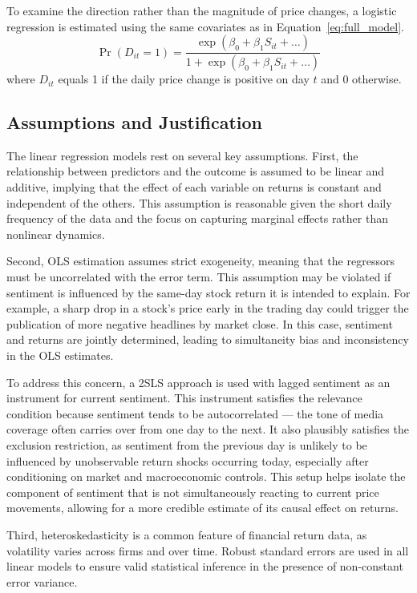 \documentclass[12pt]{article}
\begin{document}
To examine the direction rather than the magnitude of price changes, a logistic regression is estimated using the same covariates as in Equation~\ref{eq:full_model}.
\begin{equation} 
\Pr(D_{it} = 1) = \frac{\exp(\beta_0 + \beta_1 S_{it} + \ldots)}{1 + \exp(\beta_0 + \beta_1 S_{it} + \ldots)} 
\end{equation} 
where $D_{it}$ equals 1 if the daily price change is positive on day $t$ and 0 otherwise.

\subsection{Assumptions and Justification}
The linear regression models rest on several key assumptions. First, the relationship between predictors and the outcome is assumed to be linear and additive, implying that the effect of each variable on returns is constant and independent of the others. This assumption is reasonable given the short daily frequency of the data and the focus on capturing marginal effects rather than nonlinear dynamics.

Second, OLS estimation assumes strict exogeneity, meaning that the regressors must be uncorrelated with the error term. This assumption may be violated if sentiment is influenced by the same-day stock return it is intended to explain. For example, a sharp drop in a stock's price early in the trading day could trigger the publication of more negative headlines by market close. In this case, sentiment and returns are jointly determined, leading to simultaneity bias and inconsistency in the OLS estimates.

To address this concern, a 2SLS approach is used with lagged sentiment as an instrument for current sentiment. This instrument satisfies the relevance condition because sentiment tends to be autocorrelated — the tone of media coverage often carries over from one day to the next. It also plausibly satisfies the exclusion restriction, as sentiment from the previous day is unlikely to be influenced by unobservable return shocks occurring today, especially after conditioning on market and macroeconomic controls. This setup helps isolate the component of sentiment that is not simultaneously reacting to current price movements, allowing for a more credible estimate of its causal effect on returns.

Third, heteroskedasticity is a common feature of financial return data, as volatility varies across firms and over time. Robust standard errors are used in all linear models to ensure valid statistical inference in the presence of non-constant error variance.
\end{document}
